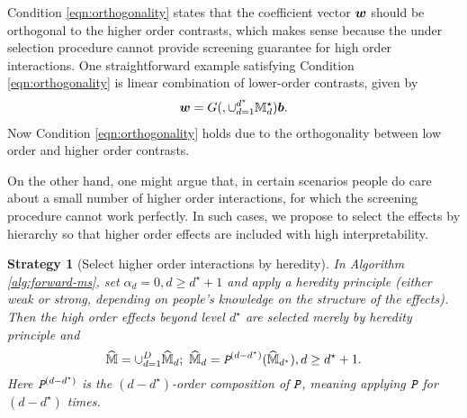 \documentclass[12pt]{article}
\newtheorem{strategy}{Strategy}
\begin{document}
Condition \eqref{eqn:orthogonality} states that the coefficient vector ${\boldsymbol{w}}$ should be orthogonal to the higher order contrasts, which makes sense because the under selection procedure cannot provide  screening guarantee for high order interactions. One straightforward example satisfying Condition \eqref{eqn:orthogonality} is linear combination of lower-order contrasts, given by
\begin{align*}
{\boldsymbol{w}} = G(,\cup_{d=1}^{d^\star}{\mathbb{M}}^\star_d) \boldsymbol{b}.
\end{align*}
 Now Condition \eqref{eqn:orthogonality} holds due to the orthogonality between low order and higher order contrasts. 




On the other hand, one might argue that, in certain scenarios people do care about a small number of higher order interactions, for which the  screening procedure cannot work perfectly. In such cases, we propose to select the effects by hierarchy so that higher order effects are included with high interpretability. 


\begin{strategy}[Select higher order interactions by heredity]\label{str:select-by-heredity}
In Algorithm \ref{alg:forward-ms}, set $\alpha_d = 0,d\ge d^\star+1$ and apply a heredity principle (either weak or strong, depending on people's knowledge on the structure of the effects). Then the high order effects beyond level $ d^\star$ are selected merely by heredity principle and 
$$
\widehat{{\mathbb{M}}} = \cup_{d=1}^{D}\widehat{{\mathbb{M}}}_{d}; ~\widehat{{\mathbb{M}}}_{d} = \texttt{\em P}^{(d-d^\star)}(\widehat{{\mathbb{M}}}_{d^\star}), d\ge d^\star+1.
$$
Here $\texttt{\em P}^{(d-d^\star)}$ is the $(d-d^\star)$-order composition of $\texttt{\em P}$, meaning applying $\texttt{\em P}$ for $(d-d^\star)$ times.
\end{strategy}
\end{document}
